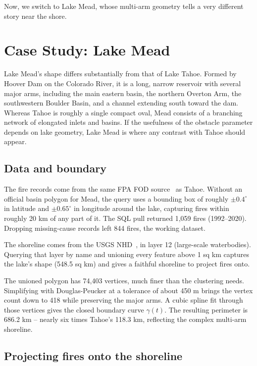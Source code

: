 \documentclass[11pt]{article}
\begin{document}
Now, we switch to Lake Mead, whose multi-arm geometry tells a very different story near the shore.

\section{Case Study: Lake Mead}
\label{sec:mead}
Lake Mead's shape differs substantially from that of Lake Tahoe. Formed by Hoover Dam on the Colorado River, it is a long, narrow reservoir with several major arms, including the main eastern basin, the northern Overton Arm, the southwestern Boulder Basin, and a channel extending south toward the dam. Whereas Tahoe is roughly a single compact oval, Mead consists of a branching network of elongated inlets and basins. If the usefulness of the obstacle parameter depends on lake geometry, Lake Mead is where any contrast with Tahoe should appear.
 
\subsection{Data and boundary}
 
The fire records come from the same FPA FOD source~\cite{fpafod} as Tahoe. Without an official basin polygon for Mead, the query uses a bounding box of roughly $\pm 0.4^\circ$ in latitude and $\pm 0.65^\circ$ in longitude around the lake, capturing fires within roughly 20 km of any part of it. The SQL pull returned 1,059 fires (1992--2020). Dropping missing-cause records left 844 fires, the working dataset.
 
The shoreline comes from the USGS NHD~\cite{nhd}, in layer 12 (large-scale waterbodies). Querying that layer by name and unioning every feature above 1 sq km captures the lake's shape (548.5 sq km) and gives a faithful shoreline to project fires onto.
 
The unioned polygon has 74,403 vertices, much finer than the clustering needs. Simplifying with Douglas-Peucker at a tolerance of about 450 m brings the vertex count down to 418 while preserving the major arms. A cubic spline fit through those vertices gives the closed boundary curve $\gamma(t)$. The resulting perimeter is 686.2 km -- nearly six times Tahoe's 118.3 km, reflecting the complex multi-arm shoreline.
 
\subsection{Projecting fires onto the shoreline}
 
\end{document}
